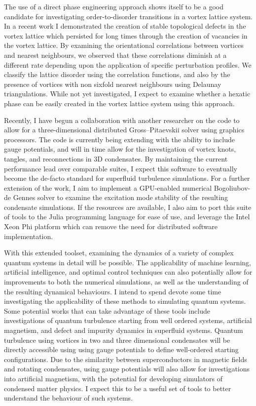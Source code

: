 \documentclass[12pt,a4paper,unicode]{moderncv}
\begin{document}
{    The use of a direct phase engineering approach shows itself to be a good candidate for investigating order-to-disorder transitions in a vortex lattice system. In a recent work I demonstrated the creation of stable topological defects in the vortex lattice which persisted for long times through the creation of vacancies in the vortex lattice. By examining the orientational correlations between vortices and nearest neighbours, we observed that these correlations diminish at a different rate depending upon the application of specific perturbation profiles. We classify the lattice disorder using the correlation functions, and also by the presence of vortices with non sixfold nearest neighbours using Delaunay triangulations. While not yet investigated, I expect to examine whether a hexatic phase can be easily created in the vortex lattice system using this approach.

    Recently, I have begun a collaboration with another researcher on the code to allow for a three-dimensional distributed Gross--Pitaevskii solver using graphics processors. The code is currently being extending with the ability to include gauge potentials, and will in time allow for the investigation of vortex knots, tangles, and reconnections in 3D condensates. By maintaining the current performance lead over comparable suites, I expect this software to eventually become the de-facto standard for superfluid turbulence simulations. For a further extension of the work, I aim to implement a GPU-enabled numerical Bogoliubov-de Gennes solver to examine the excitation mode stability of the resulting condensate simulations. If the resources are available, I also aim to port this suite of tools to the Julia programming language for ease of use, and leverage the Intel Xeon Phi platform which can remove the need for distributed software implementation.

    With this extended toolset, examining the dynamics of a variety of complex quantum systems in detail will be possible. The applicability of machine learning, artificial intelligence, and optimal control techniques can also potentially allow for improvements to both the numerical simulations, as well as the understanding of the resulting dynamical behaviours. I intend to spend devote some time investigating the applicability of these methods to simulating quantum systems. Some potential works that can take advantage of these tools include investigations of quantum turbulence starting from well ordered systems, artificial magnetism, and defect and impurity dynamics in superfluid systems. Quantum turbulence using vortices in two and three dimensional condensates will be directly accessible using using gauge potentials to define well-ordered starting configurations. Due to the similarity between superconductors in magnetic fields and rotating condensates, using gauge potentials will also allow for investigations into artificial magnetism, with the potential for developing simulators of condensed matter physics. I expect this to be a useful set of tools to better understand the behaviour of such systems.

}
\end{document}
